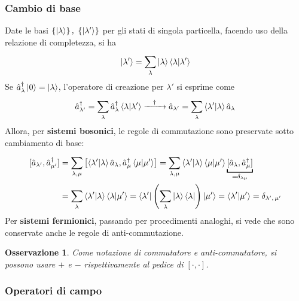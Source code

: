 \documentclass[11pt, a4paper]{scrartcl}
\theoremstyle{style}
\newtheorem{osservazione}{Osservazione}[section]
\theoremstyle{style1}
\numberwithin{equation}{subsection}
\begin{document}
\subsubsection{Cambio di base}
Date le basi $\left\{ \ket{\lambda }  \right\} , \ \left\{ \ket{\lambda '}  \right\} $ per gli stati di singola particella, facendo uso della relazione di completezza, si ha
\[
\ket{\lambda '} = \sum_{\lambda }^{}\ket{\lambda } \braket{\lambda |\lambda '} 
\] 
Se $\hat{a}^\dagger _\lambda \ket{0} = \ket{\lambda } $, l'operatore di creazione per $\lambda '$ si esprime come
\[
	\hat{a}^\dagger _{\lambda '} = \sum_{\lambda }^{} \hat{a}^\dagger _\lambda \braket{\lambda |\lambda '} \xrightarrow{\hspace{.3cm}\dagger \hspace{.3cm}} \hat{a}_{\lambda '} = \sum_{\lambda }^{}\braket{\lambda '|\lambda } \hat{a}_\lambda 
\] 
Allora, per \textbf{sistemi bosonici}, le regole di commutazione sono preservate sotto cambiamento di base:
\[
\begin{split}
	[\hat{a}_{\lambda '} , \hat{a}^\dagger _{\mu '} ] &= \sum_{\lambda ,\mu }^{}\left[ \braket{\lambda '|\lambda } \hat{a}_\lambda , \hat{a}^\dagger _\mu \braket{\mu |\mu '}  \right] =\sum_{\lambda ,\mu }^{}\braket{\lambda '|\lambda } \braket{\mu |\mu '} \underbracket{[\hat{a}_\lambda ,\hat{a}^\dagger _\mu ]}_{=\delta _{\lambda \mu } } \\
	&=\sum_{\lambda }^{} \braket{\lambda '|\lambda } \braket{\lambda |\mu '} =\bra{\lambda '} \left(\sum_{\lambda }^{}\ket{\lambda } \bra{\lambda }\right) \ket{\mu'}  = \braket{\lambda '|\mu '} = \delta _{\lambda ' ,\,\mu '} 
\end{split}
\] 
Per \textbf{sistemi fermionici}, passando per procedimenti analoghi, si vede che sono conservate anche le regole di anti-commutazione.
\begin{osservazione}
	Come notazione di commutatore e anti-commutatore, si possono usare $+$ e $-$ rispettivamente al pedice di $[\cdot ,\cdot ]$.
\end{osservazione}
\subsubsection{Operatori di campo}
\end{document}
